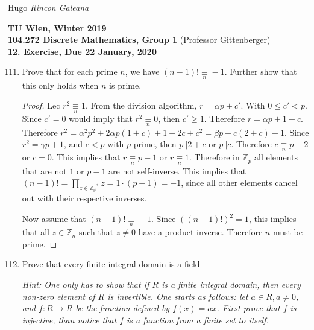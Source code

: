 \documentclass[12pt]{article}
\newcommand{\Term}{Winter 2019}
\newcommand{\Course}{104.272 Discrete Mathematics, Group 1}
\newcommand{\Assignment}{12. Exercise}
\newcommand{\DueDate}{ 22 January, 2020 }
\begin{document}
Hugo \textit{Rincon Galeana}
\begin{center}

\textbf{TU Wien, \Term} \\
\textbf{\Course} (Professor Gittenberger) \\
\textbf{\Assignment, Due \DueDate}
\end{center}


\begin{enumerate}
\setcounter{enumi}{110}
    \item Prove that for each prime $n$, we have $(n-1)! \underset{n}{\equiv} -1 $. Further show that this only holds when $n$ is prime.
    
    \begin{proof}
     Lec $r^2 \underset{n}{ \equiv} 1$. From the division algorithm, $r = \alpha p + c'$. With $0 \leq c' < p$. Since $c'= 0$ would imply that $r^2 \underset{n}{\equiv} 0$, then $c' \geq 1$. Therefore $r = \alpha p + 1 + c$. Therefore $r^2 = \alpha^2 p^2 +2 \alpha p (1+c) +1 +2c + c ^2 = \beta p + c (2+c) + 1$. Since $r^2 = \gamma p + 1$, and $c < p$ with $p$ prime, then $p \: | 2+c$ or $p \: | c$. Therefore $c  \underset{n}{\equiv} p-2$ or $c = 0$. This implies that $r \underset{n}{\equiv} p-1$ or $r \underset{n}{\equiv} 1$. Therefore in $\mathbb{Z}_p$ all elements that are not $1$ or $p-1$ are not self-inverse. This implies that $(n-1)! = \prod \limits _{z \in \mathbb{Z_p}^*} z = 1 \cdot (p-1) = -1$, since all other elements cancel out with their respective inverses.
     
     Now assume that $(n-1)! \underset{n}{\equiv} -1$. Since $((n-1)!)^2 = 1$, this implies that all $z \in \mathbb{Z}_n$ such that $z \neq 0$ have a product inverse. Therefore $n$ must be prime.
    \end{proof}
    
    \item Prove that every finite integral domain is a field
    
    \emph{Hint: One only has to show that if $R$ is a finite integral domain, then every non-zero element of $R$ is invertible. One starts as follows: let $a \in R, a \neq 0$, and $f: R \rightarrow R$ be the function defined by $f(x) = ax$. First prove that $f$ is injective, than notice that $f$ is a function from a finite set to itself.}
    

\end{enumerate}
\end{document}
